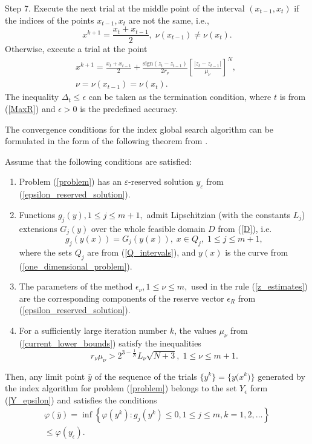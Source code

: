 \documentclass[twocolumn]{svjour3}          %
\begin{document}
Step 7. Execute the next trial at the middle point of the interval $(x_{t-1}, x_t)$ if the indices of the points $x_{t-1}, x_t$ are not the same, i.e.,
$$
	x^{k+1} = \frac{x_t + x_{t-1}}{2}, \; \nu(x_{t-1}) \neq \nu(x_t).
$$
Otherwise, execute a trial at the point
\begin{align*}
	x^{k+1} = \frac{x_t+x_{t-1}}{2} + \frac{\mathrm{sign}(z_t-z_{t-1})}{2r_\nu}\left[\frac{\left|z_t-z_{t-1}\right|}{\mu_\nu}\right]^N, \; \\
	\nu=\nu(x_{t-1})=\nu(x_t).
\end{align*}
The inequality $\Delta_t \leq \epsilon$ can be taken as the termination condition, where $t$ is from (\ref{MaxR}) and $\epsilon>0$ is the predefined accuracy.

	The convergence conditions for the index global search algorithm can be formulated in the form of the following theorem from \cite{Strongin2000}. 
\\
\begin{theorem}\label{theorem:1} Assume that the following conditions are satisfied:
	\begin{enumerate} 
		\item Problem (\ref{problem}) has an $\varepsilon$-reserved solution $y_{\varepsilon}$ from (\ref{epsilon_reserved_solution}).
		\item Functions $g_j(y), 1 \leq j \leq m+1,$ admit Lipschitzian (with the constants $L_j$) extensions $G_{j}(y)$ over the whole feasible domain $D$ from (\ref{D}), i.e.
	$$
		g_j \left( y(x) \right) = G_j \left( y(x) \right), \; x \in Q_j, \; 1 \leq j \leq m+1,
	$$
	where the sets $Q_j$ are from (\ref{Q_intervals}), and $y(x)$ is the curve from (\ref{one_dimensional_problem}).
		\item The parameters of the method $\epsilon_{\nu}, 1 \leq \nu \leq m,$ used in the rule (\ref{z_estimates}) are the corresponding components of the reserve vector $\epsilon_{R}$ from (\ref{epsilon_reserved_solution}).
		\item For a sufficiently large iteration number $k$, the values $\mu_{\nu}$ from (\ref{current_lower_bounds}) satisfy the inequalities
			\begin{equation}\label{theorem_inequalities}
				r_{\nu}\mu_{\nu} > 2^{3-\frac{1}{N}}L_{\nu}\sqrt{N+3}, \; 1 \leq \nu \leq m+1. 
			\end{equation}
	\end{enumerate}
	Then, any limit point $\bar{y}$ of the sequence of the trials $\{y^k\}=\big\{y\big(x^k\big)\big\}$ generated by the index algorithm for problem (\ref{problem}) belongs to the set $Y_{\epsilon}$ form (\ref{Y_epsilon}) and satisfies the conditions	
	\begin{eqnarray*}
		\varphi(\bar y) =	\inf\left\{\varphi(y^k):g_j(y^k) \leq 0, 1 \leq j \leq m, k = 1,2,\ldots \right\} \\
		\leq \varphi(y_{\epsilon}).
	\end{eqnarray*}
\end{theorem}
\end{document}
